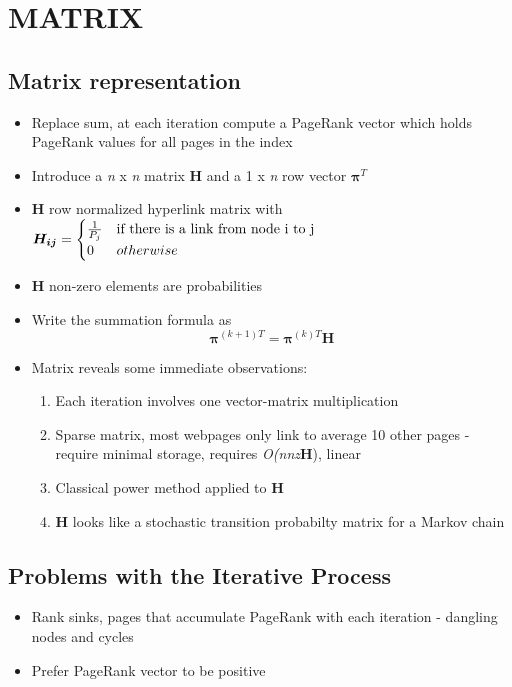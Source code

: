 \documentclass[11pt]{report}
\begin{document}
\chapter{MATRIX}
\section{Matrix representation}
\begin{itemize}
\item Replace sum, at each iteration compute a PageRank vector which holds PageRank values for all pages in the index
\item Introduce a \textit{n} x \textit{n} matrix \textbf{H} and a 1 x \textit{n} row vector $\boldsymbol{\pi}^T$
\item \textbf{H} row normalized hyperlink matrix with $\boldsymbol{H_{ij}} = \begin{cases} \frac{1}{P_j} &  \textnormal{if there is a link from node i to j}  \\ 0 & otherwise\end{cases}$ 
\item \textbf{H} non-zero elements are probabilities
\item Write the summation formula as \begin{equation}
\boldsymbol{\pi}^{(k+1)T} = \boldsymbol{\pi}^{(k)T}\textbf{H}
\end{equation}
\item Matrix reveals some immediate observations:
\begin{enumerate}
\item Each iteration involves one vector-matrix multiplication
\item Sparse matrix, most webpages only link to average 10 other pages - require minimal storage, requires \textit{O(nnz}\textbf{H}), linear
\item Classical power method applied to \textbf{H}
\item \textbf{H} looks like a stochastic transition probabilty matrix for a Markov chain
\end{enumerate}
\end{itemize}
\section{Problems with the Iterative Process}
\begin{itemize}
\item Rank sinks, pages that accumulate PageRank with each iteration - dangling nodes and cycles
\item Prefer PageRank vector to be positive
\end{itemize}
\end{document}
